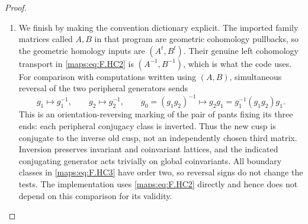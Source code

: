 \documentclass[11pt,a4paper]{article}
\theoremstyle{definition}
\begin{document}
\begin{proof}
\begin{enumerate}[label=\arabic*.]
\item We finish by making the convention dictionary explicit.
The imported family matrices called $A,B$ in that
program are geometric cohomology pullbacks, so the
geometric homology inputs are $(A^t,B^t)$.
Their genuine left cohomology transport in \eqref{maps:eq:F.HC2}
is $(A^{-1},B^{-1})$, which is what the code uses.
For comparison with computations written using
$(A,B)$, simultaneous reversal of the two peripheral
generators sends
\[
 g_1\mapsto g_1^{-1},\qquad
 g_2\mapsto g_2^{-1},\qquad
 g_0=(g_1g_2)^{-1}\mapsto
     g_2g_1=g_1^{-1}(g_1g_2)g_1 .
 \tag{F.HC12}\label{maps:eq:F.HC12}
\]
This is an orientation-reversing marking of the
pair of pants fixing its three ends: each peripheral
conjugacy class is inverted.
Thus the new cusp is conjugate to the inverse old
cusp, not an independently chosen third matrix.
Inversion preserves invariant and coinvariant
lattices, and the indicated conjugating generator
acts trivially on global coinvariants.
All boundary classes in \eqref{maps:eq:F.HC3} have order two, so
reversal signs do not change the tests.
The implementation uses \eqref{maps:eq:F.HC2} directly and hence
does not depend on this comparison for its validity.

\end{enumerate}
\end{proof}
\end{document}
